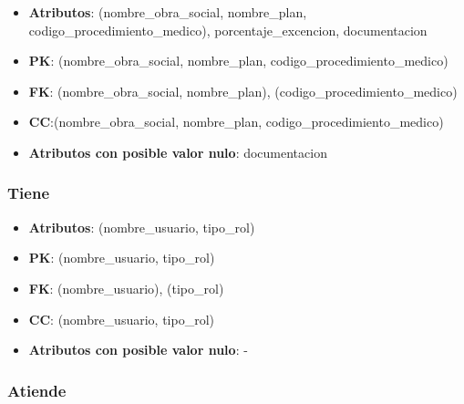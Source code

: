 \documentclass[a4paper,11pt]{article}
\begin{document}
\begin{itemize}

\item 
\textbf{Atributos}: (nombre\_obra\_social, nombre\_plan, codigo\_procedimiento\_medico),
porcentaje\_excencion, documentacion

\item 
\textbf{PK}: (nombre\_obra\_social, nombre\_plan, codigo\_procedimiento\_medico)

\item
\textbf{FK}: (nombre\_obra\_social, nombre\_plan), (codigo\_procedimiento\_medico)

\item 
\textbf{CC}:(nombre\_obra\_social, nombre\_plan, codigo\_procedimiento\_medico)

\item 
\textbf{Atributos con posible valor nulo}: documentacion

\end{itemize}
\subsubsection{\textbf{Tiene}}

\begin{itemize}

\item 
\textbf{Atributos}: (nombre\_usuario, tipo\_rol)

\item 
\textbf{PK}: (nombre\_usuario, tipo\_rol)

\item
\textbf{FK}: (nombre\_usuario), (tipo\_rol)

\item 
\textbf{CC}: (nombre\_usuario, tipo\_rol)

\item 
\textbf{Atributos con posible valor nulo}: -

\end{itemize}
\subsubsection{\textbf{Atiende}}
\end{document}
